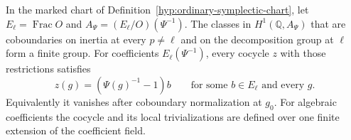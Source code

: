 \begin{proposition}\label{prop:negative-twist-finite}
In the marked chart of Definition~\ref{hyp:ordinary-symplectic-chart},
let \(E_\ell=\operatorname{Frac}O\) and \(A_\Psi=(E_\ell/O)(\Psi^{-1})\).
The classes in \(H^1(\mathbb Q,A_\Psi)\) that are coboundaries on
inertia at every \(p\ne\ell\) and on the decomposition group at
\(\ell\) form a finite group. For coefficients \(E_\ell(\Psi^{-1})\), every cocycle \(z\) with those restrictions satisfies 
\[
 z(g)=(\Psi(g)^{-1}-1)b\qquad\text{for some }b\in E_\ell\text{ and every }g.
\]
 Equivalently it
vanishes after coboundary normalization at \(g_0\). For algebraic
coefficients the cocycle and its local trivializations are defined
over one finite extension of the coefficient field.
\end{proposition}

